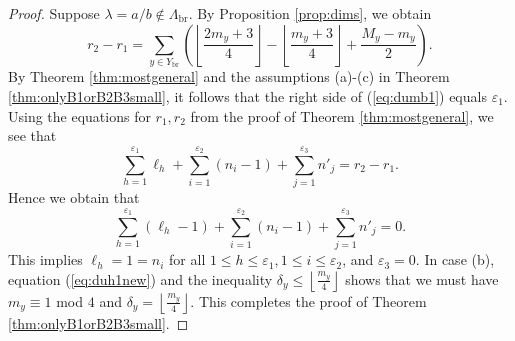 \documentclass{amsart}
\numberwithin{equation}{section}
\numberwithin{table}{section}
\theoremstyle{plain}
\theoremstyle{definition}
\theoremstyle{remark}
\begin{document}
\begin{proof}
Suppose $\lambda=a/b \not\in \Lambda_{\mathrm{br}}$. By Proposition \ref{prop:dims}, we obtain
\begin{equation}
\label{eq:dumb1}
r_2 - r_1= \sum_{y\in Y_{\mathrm{br}}} \left( \left\lfloor \frac{2m_y+3}{4}\right\rfloor - \left\lfloor \frac{m_y+3}{4}\right\rfloor +\frac{M_y-m_y}{2}\right).
\end{equation}
By Theorem \ref{thm:mostgeneral} and the assumptions (a)-(c) in Theorem \ref{thm:onlyB1orB2B3small}, it follows that the right side of (\ref{eq:dumb1}) equals $\varepsilon_1$. Using the equations for $r_1, r_2$ from the proof of Theorem \ref{thm:mostgeneral}, we see that
\begin{equation}
\label{eq:dumb2}
\sum_{h=1}^{\varepsilon_1}  \ell_h + \sum_{i=1}^{\varepsilon_2} (n_i-1) +\sum_{j=1}^{\varepsilon_3} n'_j = r_2-r_1.
\end{equation}
Hence we obtain that
$$\sum_{h=1}^{\varepsilon_1}  (\ell_h - 1) + \sum_{i=1}^{\varepsilon_2} (n_i-1) +\sum_{j=1}^{\varepsilon_3} n'_j = 0 .$$
This implies $\ell_h=1=n_i$ for all $1\le h \le \varepsilon_1,1\le i\le \varepsilon_2$, and $\varepsilon_3=0$. In case (b), equation (\ref{eq:duh1new}) and the inequality $\delta_y\le \left\lfloor \frac{m_y}{4}\right\rfloor$ shows that we must have $m_y\equiv 1$ mod $4$ and $\delta_y=\left\lfloor \frac{m_y}{4}\right\rfloor$. This completes the proof of Theorem \ref{thm:onlyB1orB2B3small}.
\end{proof}
\end{document}
